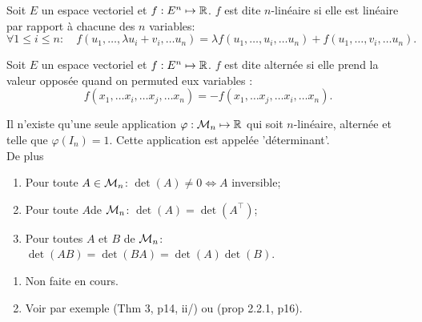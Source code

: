 \begin{definition*}
  Soit $E$ un espace vectoriel et $f: E^n \mapsto \mathbb{R}$. $f$ est dite $n$-linéaire si elle est linéaire par rapport à chacune des $n$ variables:
  $$
  \forall 1 \leq i \leq n: \quad
  f(u_1, \dots, \lambda u_i + v_i, \dots u_n) = \lambda f(u_1, \dots, u_i, \dots u_n) + f(u_1, \dots, v_i, \dots u_n).
  $$
\end{definition*}

\begin{definition*}
  Soit $E$ un espace vectoriel et $f: E^n \mapsto \mathbb{R}$. $f$ est dite alternée si elle prend la valeur opposée quand on permuted eux variables : 
  $$
  f(x_1, \dots x_i, \dots x_j, \dots x_n)
  =
  - f(x_1, \dots x_j, \dots x_i, \dots x_n).
  $$
\end{definition*}

\begin{theorem*}
  Il n'existe qu'une seule application $\varphi: \mathcal{M}_n \mapsto \mathbb{R}$ qui soit $n$-linéaire, alternée et telle que $\varphi(I_n) = 1$. Cette application est appelée 'déterminant'. \\
  De plus
  \begin{enumerate}[($a$)]
   \item Pour toute $A \in \mathcal{M}_n$: $\det(A) \neq 0 \Leftrightarrow A$ inversible;
   \item Pour toute $A$de $\mathcal{M}_n$: $\det(A) = \det(A^\top)$;
   \item Pour toutes $A$ et $B$ de $\mathcal{M}_n$: $\det(A B) = \det(B A) = \det(A) \det(B)$.
  \end{enumerate}
\end{theorem*}

\proof [Théorème 1.2.5]
\begin{enumerate}[\itemdot]
 \item Non faite en cours. 
 \item Voir par exemple \cite{GAJ94} (Thm 3, p14, ii/) ou \cite{Ser01} (prop 2.2.1, p16).
\end{enumerate}
\eproof

